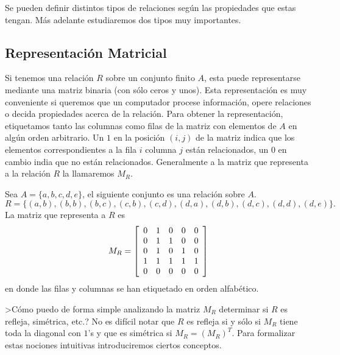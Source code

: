 Se pueden definir distintos tipos de relaciones según las propiedades que estas tengan.
Más adelante estudiaremos dos tipos muy importantes.

\subsection{Representación Matricial}
Si tenemos una relación $R$ sobre un conjunto finito $A$, esta puede representarse mediante una matriz binaria (con sólo ceros y unos).
Esta representación es muy conveniente si queremos que un computador procese información, opere relaciones o decida propiedades acerca de la relación.
Para obtener la representación, etiquetamos tanto las columnas como filas de la matriz con elementos de $A$ en algún orden arbitrario.
Un $1$ en la posición $(i,j)$ de la matriz indica que los elementos correspondientes a la fila $i$ columna $j$ están relacionados, un $0$ en cambio india que no están relacionados.
Generalmente a la matriz que representa a la relación $R$ la llamaremos $M_R$.

\begin{ejemplo}
Sea $A=\{a,b,c,d,e\}$, el siguiente conjunto es una relación sobre $A$.
  \[
  R=\{(a,b),(b,b),(b,c),(c,b),(c,d),(d,a),(d,b),(d,c),(d,d),(d,e)\}.
  \]
  La matriz que representa a $R$ es
  \[
  M_R=
  \left[
  \begin{array}{c c c c c}
  0 & 1 & 0 & 0 & 0 \\
  0 & 1 & 1 & 0 & 0 \\
  0 & 1 & 0 & 1 & 0 \\
  1 & 1 & 1 & 1 & 1 \\
  0 & 0 & 0 & 0 & 0 
  \end{array}\right]
  \]
  en donde las filas y columnas se han etiquetado en orden alfabético.
\end{ejemplo}

>Cómo puedo de forma simple analizando la matriz $M_R$ determinar si $R$ es refleja, simétrica, etc.?
No es difícil notar que $R$ es refleja si y sólo si $M_R$ tiene toda la diagonal con $1$'s y que es simétrica si $M_R=(M_R)^T$.
Para formalizar estas nociones intuitivas introduciremos ciertos conceptos.

